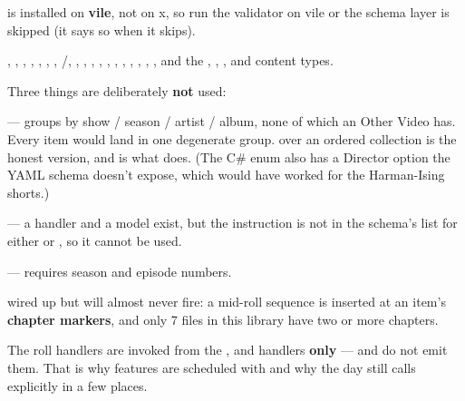 \documentclass[fontpath=fonts/,logopath=logo/]{riposte-doc}
\begin{document}
 is installed on \textbf{vile}, not on x, so run the validator on vile or the schema layer is skipped (it says so when it skips).



, , , , , , , /, , , , , , , , , , , , and the , , ,  and  content types.

Three things are deliberately \textbf{not} used:

\begin{ripbullets}
\item \textbf{} — groups by show / season / artist / album, none of which an Other Video has. Every item would land in one degenerate group.  over an ordered collection is the honest version, and is what  does. (The C\# enum also has a Director option the YAML schema doesn't expose, which would have worked for the Harman-Ising shorts.)
\item \textbf{} — a handler and a model exist, but the instruction is not in the schema's  list for either  or , so it cannot be used.
\item \textbf{} — requires season and episode numbers.
\end{ripbullets}

  wired up but will almost never fire: a mid-roll sequence is inserted at an item's \textbf{chapter markers}, and only 7 files in this library have two or more chapters.



The roll handlers are invoked from the ,  and  handlers \textbf{only} —  and  do not emit them. That is why features are scheduled with  and why the day still calls  explicitly in a few places.
\end{document}

